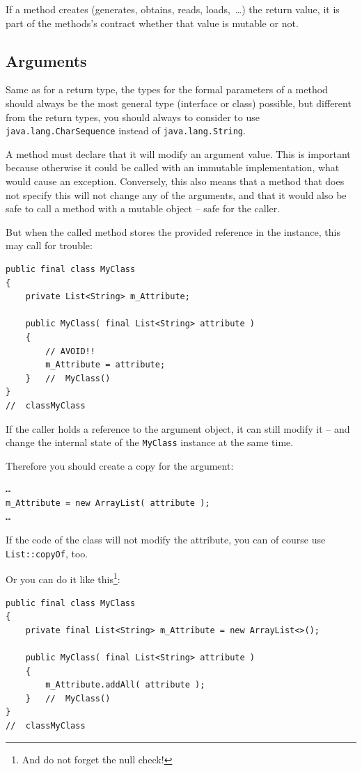 \documentclass[11pt,a4paper, titlepage, parskip=half, headsepline, footsepline, cleardoublepage=current, headheight=1cm]{scrbook}
\begin{document}
If a method creates (generates, obtains, reads, loads,~…) the return value, it is part of the methods's contract whether that value is mutable or not. 

\subsection{Arguments}\label{sec:Arguments}
Same as for a return type, the types for the formal parameters of a method should always be the most general type (interface or class) possible, but different from the return types, you should always to consider to use \lstinline|java.lang.CharSequence| instead of \lstinline|java.lang.String|.

A method must declare that it will modify an argument value. This is important because otherwise it could be called with an immutable implementation, what would cause an exception. Conversely, this also means that a method that does not specify this will not change any of the arguments, and that it would also be safe to call a method with a mutable object – safe for the caller.

But when the called method stores the provided reference in the instance, this may call for trouble:
\begin{lstlisting}
public final class MyClass
{
    private List<String> m_Attribute;
    
    public MyClass( final List<String> attribute )
    {
        // AVOID!!
        m_Attribute = attribute;
    }   //  MyClass()
}
//  classMyClass
\end{lstlisting}

If the caller holds a reference to the argument object, it can still modify it – and change the internal state of the \lstinline|MyClass| instance at the same time.

Therefore you should create a copy for the argument:
\begin{lstlisting}
…
m_Attribute = new ArrayList( attribute );
…
\end{lstlisting}
If the code of the class will not modify the attribute, you can of course use \lstinline|List::copyOf|, too.

Or you can do it like this\footnote{And do not forget the null check!}:
\begin{lstlisting}
public final class MyClass
{
    private final List<String> m_Attribute = new ArrayList<>();
    
    public MyClass( final List<String> attribute )
    {
        m_Attribute.addAll( attribute );
    }   //  MyClass()
}
//  classMyClass
\end{lstlisting}
\end{document}
